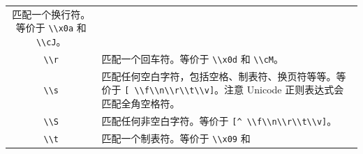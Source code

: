 \documentclass[doctor,openright,twoside]{sjtuthesis}
\newcommand{\passthrough}[1]{#1}
\theoremstyle{plain}
\theoremstyle{definition}
\theoremstyle{remark}
\theoremstyle{ocrenumbox}
\theoremstyle{plain}
\begin{document}
\begin{longtable}[]{@{}cl@{}}
\begin{minipage}[t]{0.72\columnwidth}
匹配一个换行符。等价于 \passthrough{\lstinline!\\x0a!} 和
\passthrough{\lstinline!\\cJ!}。\strut
\end{minipage}\tabularnewline
\begin{minipage}[t]{0.23\columnwidth}\centering
\passthrough{\lstinline!\\r!}\strut
\end{minipage} & \begin{minipage}[t]{0.72\columnwidth}\raggedright
匹配一个回车符。等价于 \passthrough{\lstinline!\\x0d!} 和
\passthrough{\lstinline!\\cM!}。\strut
\end{minipage}\tabularnewline
\begin{minipage}[t]{0.23\columnwidth}\centering
\passthrough{\lstinline!\\s!}\strut
\end{minipage} & \begin{minipage}[t]{0.72\columnwidth}\raggedright
匹配任何空白字符，包括空格、制表符、换页符等等。等价于
\passthrough{\lstinline![ \\f\\n\\r\\t\\v]!}。注意 Unicode
正则表达式会匹配全角空格符。\strut
\end{minipage}\tabularnewline
\begin{minipage}[t]{0.23\columnwidth}\centering
\passthrough{\lstinline!\\S!}\strut
\end{minipage} & \begin{minipage}[t]{0.72\columnwidth}\raggedright
匹配任何非空白字符。等价于
\passthrough{\lstinline![^ \\f\\n\\r\\t\\v]!}。\strut
\end{minipage}\tabularnewline
\begin{minipage}[t]{0.23\columnwidth}\centering
\passthrough{\lstinline!\\t!}\strut
\end{minipage} & \begin{minipage}[t]{0.72\columnwidth}\raggedright
匹配一个制表符。等价于 \passthrough{\lstinline!\\x09!} 和

\end{minipage}
\end{longtable}
\end{document}
